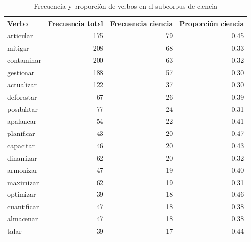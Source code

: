 \documentclass[11pt,a4paper]{article}
\begin{document}
\begin{table}[H]
	\centering
	\begin{tabular}{lrrr}
		\toprule
		\textbf{Verbo} & \textbf{Frecuencia total} & \textbf{Frecuencia ciencia} & \textbf{Proporción ciencia} \\
		\midrule
		articular     & 175 & 79 & 0.45 \\
		mitigar       & 208 & 68 & 0.33 \\
		contaminar    & 200 & 63 & 0.32 \\
		gestionar     & 188 & 57 & 0.30 \\
		actualizar    & 122 & 37 & 0.30 \\
		deforestar    & 67  & 26 & 0.39 \\
		posibilitar   & 77  & 24 & 0.31 \\
		apalancar     & 54  & 22 & 0.41 \\
		planificar    & 43  & 20 & 0.47 \\
		capacitar     & 46  & 20 & 0.43 \\
		dinamizar     & 62  & 20 & 0.32 \\
		armonizar     & 47  & 19 & 0.40 \\
		maximizar     & 62  & 19 & 0.31 \\
		optimizar     & 39  & 18 & 0.46 \\
		cuantificar   & 47  & 18 & 0.38 \\
		almacenar     & 47  & 18 & 0.38 \\
		talar         & 39  & 17 & 0.44 \\
		\bottomrule
	\end{tabular}
	\caption{Frecuencia y proporción de verbos en el subcorpus de ciencia}
	\label{tab:verbos_ciencia}
\end{table}
\end{document}
